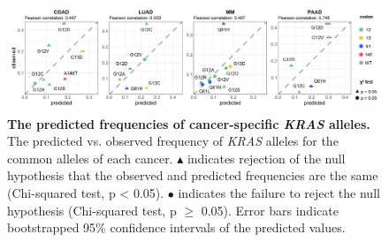 \documentclass[english, 10pt, letterpaper]{article}
\newcommand{\KRAS}{\emph{KRAS}}
\begin{document}
\begin{figure}[h!]
\centering
\includegraphics[width=176mm]{figures/Fig_2_mod.jpg}
\caption{
    \textbf{The predicted frequencies of cancer-specific \KRAS{} alleles.}
    The predicted vs. observed frequency of \KRAS{} alleles for the common alleles of each cancer. $\blacktriangle$ indicates rejection of the null hypothesis that the observed and predicted frequencies are the same (Chi-squared test, p < 0.05). $\bullet$ indicates the failure to reject the null hypothesis (Chi-squared test, p $\ge$ 0.05). Error bars indicate bootstrapped 95\% confidence intervals of the predicted values.
}
\label{fig:obs-vs-pred-main}
\end{figure}
\newpage
\end{document}
